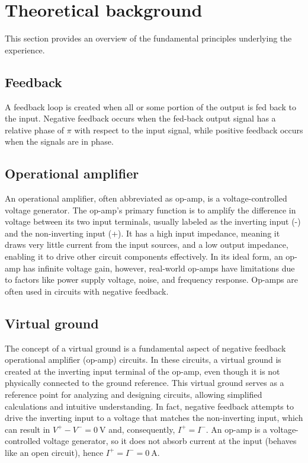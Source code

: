 \section{Theoretical background}
This section provides an overview of the fundamental principles underlying the experience.

	\subsection{Feedback}
		A feedback loop is created when all or some portion of the output is fed back to the input. 
		Negative feedback occurs when the fed-back output signal has a relative phase of $\pi$ with respect to the input signal, 
		while positive feedback occurs when the signals are in phase.
	
	\subsection{Operational amplifier}
		An operational amplifier, often abbreviated as op-amp, is a voltage-controlled voltage generator.
		The op-amp's primary function is to amplify the difference in voltage between its two input terminals, usually labeled as the inverting input (-) and the non-inverting input (+). 
		It has a high input impedance, meaning it draws very little current from the input sources, and a low output impedance, enabling it to drive other circuit components effectively. 
		In its ideal form, an op-amp has infinite voltage gain, however, real-world op-amps have limitations due to factors like power supply voltage, noise, and frequency response. 
		Op-amps are often used in circuits with negative feedback.
	
	\subsection{Virtual ground}
		The concept of a virtual ground is a fundamental aspect of negative feedback operational amplifier (op-amp) circuits. 
		In these circuits, a virtual ground is created at the inverting input terminal of the op-amp, even though it is not physically connected to the ground reference. 
		This virtual ground serves as a reference point for analyzing and designing circuits, allowing simplified calculations and intuitive understanding.
		In fact, negative feedback attempts to drive the inverting input to a voltage that matches the non-inverting input, which can result in $V^+ - V^- = \SI{0}{\volt}$ and, consequently, $I^+ = I^-$.
		An op-amp is a voltage-controlled voltage generator, so it does not absorb current at the input (behaves like an open circuit), hence $I^+ = I^- = \SI{0}{\ampere}$. 

